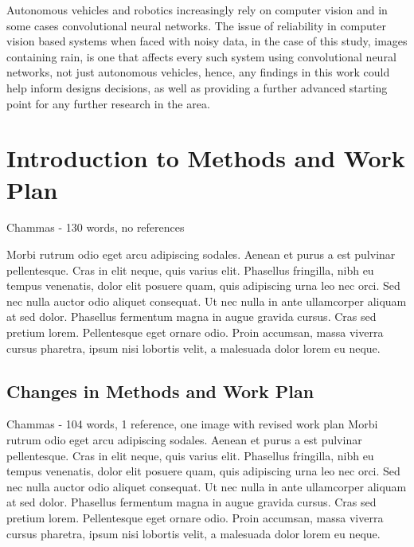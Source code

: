 Autonomous vehicles and robotics increasingly rely on computer vision and in some cases convolutional neural networks. The issue of reliability in computer vision based systems when faced with noisy data, in the case of this study, images containing rain, is one that affects every such system using convolutional neural networks, not just autonomous vehicles, hence, any findings in this work could help inform designs decisions, as well as providing a further advanced starting point for any further research in the area.


\section{Introduction to Methods and Work Plan}

Chammas - 130 words, no references

Morbi rutrum odio eget arcu adipiscing sodales. Aenean et purus a est pulvinar pellentesque. Cras in elit neque, quis varius elit. Phasellus fringilla, nibh eu tempus venenatis, dolor elit posuere quam, quis adipiscing urna leo nec orci. Sed nec nulla auctor odio aliquet consequat. Ut nec nulla in ante ullamcorper aliquam at sed dolor. Phasellus fermentum magna in augue gravida cursus. Cras sed pretium lorem. Pellentesque eget ornare odio. Proin accumsan, massa viverra cursus pharetra, ipsum nisi lobortis velit, a malesuada dolor lorem eu neque.


\subsection{Changes in Methods and Work Plan}

Chammas - 104 words, 1 reference, one image with revised work plan
Morbi rutrum odio eget arcu adipiscing sodales. Aenean et purus a est pulvinar pellentesque. Cras in elit neque, quis varius elit. Phasellus fringilla, nibh eu tempus venenatis, dolor elit posuere quam, quis adipiscing urna leo nec orci. Sed nec nulla auctor odio aliquet consequat. Ut nec nulla in ante ullamcorper aliquam at sed dolor. Phasellus fermentum magna in augue gravida cursus. Cras sed pretium lorem. Pellentesque eget ornare odio. Proin accumsan, massa viverra cursus pharetra, ipsum nisi lobortis velit, a malesuada dolor lorem eu neque.

